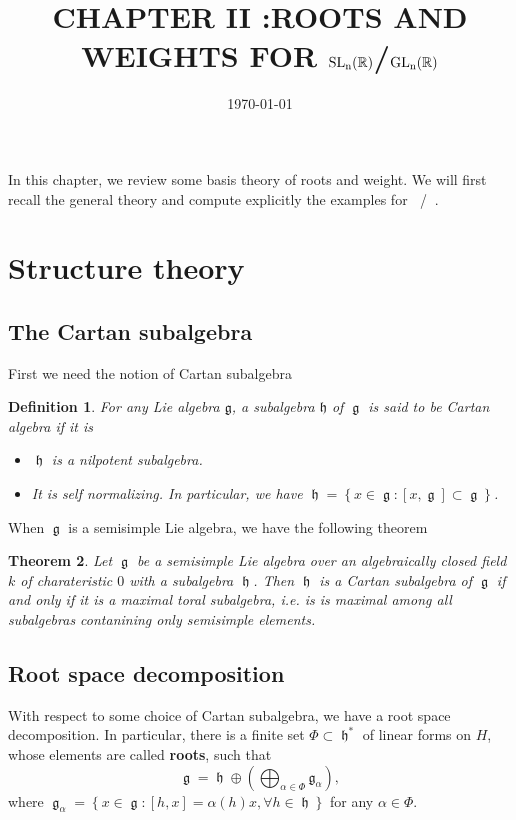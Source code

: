 \documentclass[12pt]{article} %
\title{CHAPTER II :ROOTS AND WEIGHTS FOR $\SLn$/$\GLn$} %
\date{\today} %
\newtheorem{definition}{Definition}[section]
\newtheorem{theorem}[definition]{Theorem}
\DeclareMathOperator{\SLn}{\text{SL}_n(\mathbb{R})}
\DeclareMathOperator{\GLn}{\text{GL}_n(\mathbb{R})}
\DeclareMathOperator{\fg}{\mathfrak{g}}
\DeclareMathOperator{\fh}{\mathfrak{h}}
\begin{document}
\maketitle
In this chapter, we review some basis theory of roots and weight. We will first recall the
general theory and compute explicitly the examples for $\SLn$/$\GLn$.
\section{Structure theory}
\subsection{The Cartan subalgebra}
First we need the notion of Cartan subalgebra
\begin{definition}
    For any Lie algebra $\mathfrak{g}$, a subalgebra $\mathfrak{h}$ of $\fg$ is said to be \textit{Cartan algebra} if it is
    \begin{itemize}
        \item $\fh$ is a nilpotent subalgebra.
        \item It is self normalizing. In particular, we have $\fh = \left\lbrace x \in \fg : [x,\fg] \subset \fg\right\rbrace$.
    \end{itemize}
\end{definition}
When $\fg$ is a semisimple Lie algebra, we have the following theorem
\begin{theorem}
    Let $\fg$ be a semisimple Lie algebra over an algebraically closed field $k$ of charateristic $0$ with a subalgebra $\fh$.
    Then $\fh$ is a Cartan subalgebra of $\fg$ if and only if it is a maximal toral subalgebra, i.e. is is maximal among all subalgebras
    contanining only semisimple elements.
\end{theorem}
\subsection{Root space decomposition}
With respect to some choice of Cartan subalgebra, we have a root space decomposition. In particular, there is a finite set
$\Phi \subset \fh^{*}$ of linear forms on $H$, whose elements are called \textbf{roots}, such that
\[\fg = \fh \oplus \left(\bigoplus_{\alpha \in \Phi} \mathfrak{g}_\alpha\right),\]
where $\fg_\alpha = \left\lbrace x \in \fg: [h,x] = \alpha(h)x, \forall h \in \fh\right\rbrace$ for any $\alpha \in \Phi$.
\end{document}
